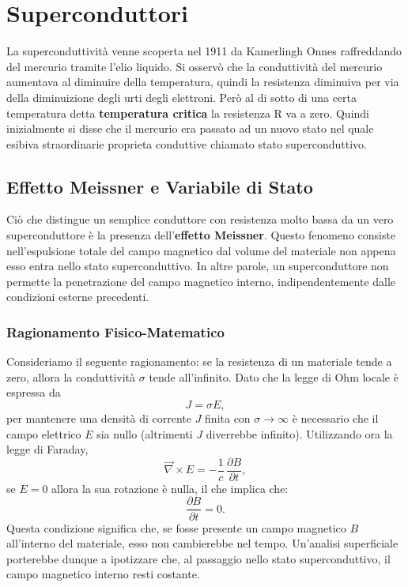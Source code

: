 \chapter{Superconduttori}
La superconduttività venne scoperta nel 1911 da Kamerlingh Onnes raffreddando del mercurio tramite l'elio liquido. Si osservò che la conduttività del mercurio aumentava al diminuire della temperatura, quindi la resistenza diminuiva per via della diminuizione degli urti degli elettroni. Però al di sotto di una certa temperatura detta \textbf{temperatura critica} la resistenza R va a zero. Quindi inizialmente si disse che il mercurio era passato ad un nuovo stato nel quale esibiva straordinarie proprieta conduttive chiamato stato superconduttivo.
\section{Effetto Meissner e Variabile di Stato}
Ciò che distingue un semplice conduttore con resistenza molto bassa da un vero superconduttore è la presenza dell'\textbf{effetto Meissner}. Questo fenomeno consiste nell'espulsione totale del campo magnetico dal volume del materiale non appena esso entra nello stato superconduttivo. In altre parole, un superconduttore non permette la penetrazione del campo magnetico interno, indipendentemente dalle condizioni esterne precedenti.
\subsection*{Ragionamento Fisico-Matematico}
Consideriamo il seguente ragionamento: se la resistenza di un materiale tende a zero, allora la conduttività \(\sigma\) tende all'infinito. Dato che la legge di Ohm locale è espressa da
\[
J = \sigma E,
\]
per mantenere una densità di corrente \(J\) finita con \(\sigma \to \infty\) è necessario che il campo elettrico \(E\) sia nullo (altrimenti \(J\) diverrebbe infinito). 
Utilizzando ora la legge di Faraday,
\[
\vec{\nabla} \times E = -\frac{1}{c}\,\frac{\partial B}{\partial t},
\]
se \(E = 0\) allora la sua rotazione è nulla, il che implica che:
\[
\frac{\partial B}{\partial t} = 0.
\]
Questa condizione significa che, se fosse presente un campo magnetico \(B\) all'interno del materiale, esso non cambierebbe nel tempo. Un'analisi superficiale porterebbe dunque a ipotizzare che, al passaggio nello stato superconduttivo, il campo magnetico interno resti costante.
